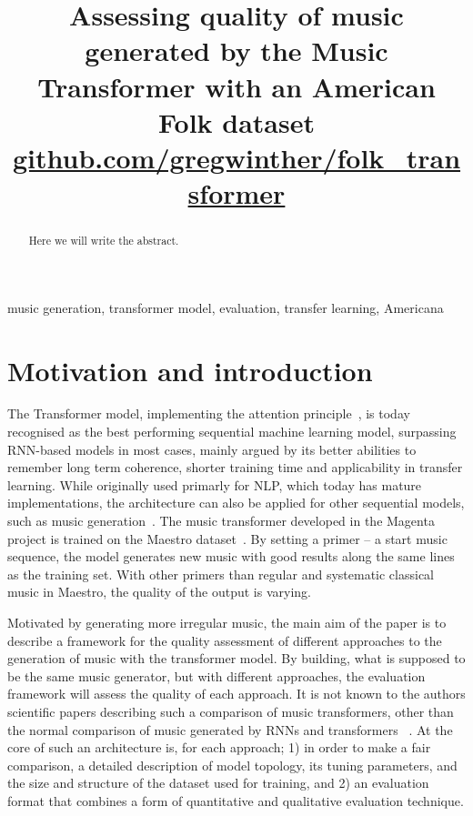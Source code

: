 \documentclass{IEEEtran}
\title{Assessing quality of music generated by the Music Transformer with an American Folk dataset \\
    \normalsize{\url{github.com/gregwinther/folk_transformer}}}
\author{\IEEEauthorblockN{Sebastian G. Winther-Larsen}
\IEEEauthorblockA{\textit{Institute of Informatics, University of Oslo} \\
}
\and
\IEEEauthorblockN{Tom F. Hansen}
\IEEEauthorblockA{\textit{Institute of Informatics, University of Oslo} \\
}
\and
\IEEEauthorblockN{Bjørn Iversen}
\IEEEauthorblockA{\textit{Institute of Informatics, University of Oslo} \\
}
}
\begin{document}
    \maketitle

    \begin{abstract}
        Here we will write the abstract.

        \end{abstract}
        
        \begin{IEEEkeywords}
        music generation, transformer model, evaluation, transfer learning, Americana
        \end{IEEEkeywords}

    \section{Motivation and introduction}

        The Transformer model, implementing the attention principle~\cite{vaswani2017attention},
        is today recognised as the best performing sequential machine learning model,
        surpassing RNN-based models in most cases, mainly argued by its better abilities
        to remember long term coherence, shorter training time and applicability in transfer learning.
        While originally used primarly for NLP, which today has mature implementations,
        the architecture can also be applied for other sequential models, such as music generation~\cite{huang2018music}.
        The music transformer developed in the Magenta project is trained on the Maestro
        dataset~\cite{maestrodataset}.
        By setting a primer – a start music sequence, the model generates new music with good
        results along the same lines as the training set. With other primers than regular and
        systematic classical music in Maestro, the quality of the output is varying.
        
        Motivated by generating more irregular music, the main aim of the paper is
        to describe a framework for the quality assessment of different approaches to the generation 
        of music with the transformer model. By building, what is supposed to be the same 
        music generator, but with different approaches, the evaluation framework will assess 
        the quality of each approach. It is not known to the authors scientific papers
        describing such a comparison of music transformers, other than the normal
        comparison of music generated by RNNs and transformers ~\cite{huang2018music}.
        At the core of such an architecture is, for each approach; 1) in order to make a fair comparison,
        a detailed description of model topology, its tuning parameters, and the size
        and structure of the dataset used for training, and 2) an evaluation format
        that combines a form of quantitative and qualitative evaluation technique.
       
\end{document}
